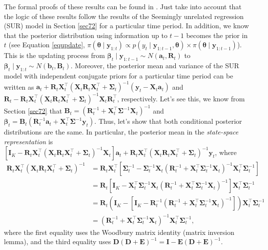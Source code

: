 The formal proofs of these results can be found in \cite[Chap~2]{petris2009dynamic}. Just take into account that the logic of these results follow the results of the Seemingly unrelated regression (SUR) model in Section \ref{sec72} for a particular time period. In addition, we know that the posterior distribution using information up to $t-1$ becomes the prior in $t$ (see Equation \ref{equpdate}, $\pi(\bm{\theta}\mid \mathbf{y}_{1:t})\propto p(y_{t}\mid \bm{y}_{1:t-1},\bm{\theta})\times \pi(\bm{\theta}\mid \bm{y}_{1:t-1})$). This is the updating process from  $\bm{\beta}_t\mid \bm{y}_{1:t-1}\sim N(\bm{a}_t, \bm{R}_t)$ to $\bm{\beta}_t\mid \bm{y}_{1:t}\sim N(\bm{b}_t, \bm{B}_t)$. Moreover, the posterior mean and variance of the SUR model with independent conjugate priors for a particular time period can be written as $\bm{a}_{t}+\bm{R}_{t}\bm{X}_t^{\top}(\bm{X}_t\bm{R}_{t}\bm{X}_t^{\top}+ \bm{\Sigma}_t)^{-1}(\bm{y}_t-\bm{X}_t\bm{a}_{t})$ and $\bm{R}_{t}-\bm{R}_{t}\bm{X}_t^{\top}(\bm{X}_t\bm{R}_{t}\bm{X}_t^{\top}+\bm{\Sigma}_t)^{-1} \bm{X}_t\bm{R}_{t}^{\top}$, respectively. Let's see this, we know from Section \ref{sec72} that $\bm{B}_t=(\bm{R}_t^{-1}+\bm{X}_t^{\top}\bm{\Sigma}^{-1}\bm{X}_t)^{-1}$ and $\bm{\beta}_t=\bm{B}_t(\bm{R}_t^{-1}\bm{a}_t+\bm{X}_t^{\top}\bm{\Sigma}^{-1}\bm{y}_t)$. Thus, let's show that both conditional posterior distributions are the same. In particular, the posterior mean in the \textit{state-space representation} is $[\bm{I}_K-\bm{R}_{t}\bm{X}_t^{\top}(\bm{X}_t\bm{R}_{t}\bm{X}_t^{\top}+ \bm{\Sigma}_t)^{-1}\bm{X}_t]\bm{a}_{t}+\bm{R}_{t}\bm{X}_t^{\top}(\bm{X}_t\bm{R}_{t}\bm{X}_t^{\top}+ \bm{\Sigma}_t)^{-1}\bm{y}_t$, where 
\begin{align*}
	\bm{R}_{t}\bm{X}_t^{\top}(\bm{X}_t\bm{R}_{t}\bm{X}_t^{\top}+ \bm{\Sigma}_t)^{-1}
	&=\bm{R}_{t}\bm{X}_t^{\top}[\bm{\Sigma}_t^{-1}-\bm{\Sigma}_t^{-1}\bm{X}_t(\bm{R}_t^{-1}+\bm{X}_t^{\top}\bm{\Sigma}_t^{-1}\bm{X}_t)^{-1}\bm{X}_t^{\top}\bm{\Sigma}_t^{-1}]\\
	&=\bm{R}_{t}[\bm{I}_K-\bm{X}_t^{\top}\bm{\Sigma}_t^{-1}\bm{X}_t(\bm{R}_t^{-1}+\bm{X}_t^{\top}\bm{\Sigma}_t^{-1}\bm{X}_t)^{-1}]\bm{X}_t^{\top}\bm{\Sigma}_t^{-1}\\
	&=\bm{R}_{t}(\bm{I}_K-[\bm{I}_K-\bm{R}_t^{-1}(\bm{R}_t^{-1}+\bm{X}_t^{\top}\bm{\Sigma}_t^{-1}\bm{X}_t)^{-1}])\bm{X}_t^{\top}\bm{\Sigma}_t^{-1}\\
	&=(\bm{R}_t^{-1}+\bm{X}_t^{\top}\bm{\Sigma}_t^{-1}\bm{X}_t)^{-1}\bm{X}_t^{\top}\bm{\Sigma}_t^{-1},
\end{align*}
where the first equality uses the Woodbury matrix identity (matrix inversion lemma), and the third equality uses $\bm{D}(\bm{D}+\bm{E})^{-1}=\bm{I}-\bm{E}(\bm{D}+\bm{E})^{-1}$.

